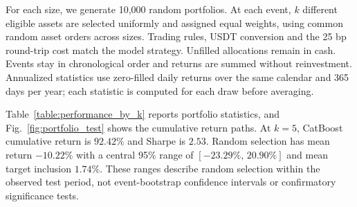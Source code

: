 \documentclass{ieeeaccess}
\begin{document}
For each size, we generate 10{,}000 random portfolios. At each event, $k$ different eligible assets are selected uniformly and assigned equal weights, using common random asset orders across sizes. Trading rules, USDT conversion and the 25 bp round-trip cost match the model strategy. Unfilled allocations remain in cash. Events stay in chronological order and returns are summed without reinvestment. Annualized statistics use zero-filled daily returns over the same calendar and 365 days per year; each statistic is computed for each draw before averaging.

Table~\ref{table:performance_by_k} reports portfolio statistics, and Fig.~\ref{fig:portfolio_test}\label{firstref:fig:portfolio_test} shows the cumulative return paths. At $k=5$, CatBoost cumulative return is $92.42\%$ and Sharpe is $2.53$. Random selection has mean return $-10.22\%$ with a central 95\% range of $[-23.29\%,\,20.90\%]$ and mean target inclusion $1.74\%$. These ranges describe random selection within the observed test period, not event-bootstrap confidence intervals or confirmatory significance tests.
\end{document}
